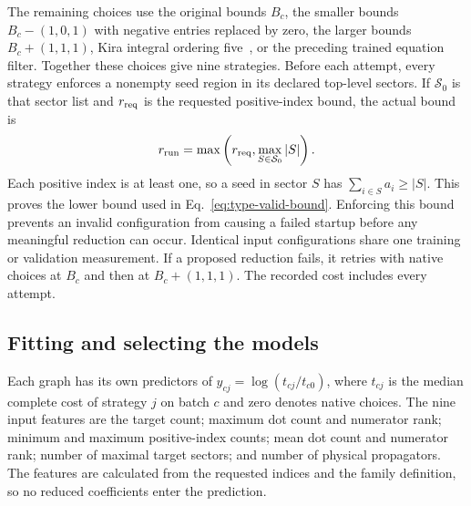 The remaining choices use the original bounds $B_c$, the smaller bounds
$B_c-(1,0,1)$ with negative entries replaced by zero, the larger bounds
$B_c+(1,1,1)$, Kira integral ordering five~\cite{Kira12}, or the preceding
trained equation filter. Together these choices give nine strategies.
Before each attempt, every strategy enforces a nonempty seed region in
its declared top-level sectors. If $\mathcal S_0$ is that sector list and
$r_{\rm req}$ is the requested positive-index bound, the actual bound is
\begin{equation}
 r_{\rm run}=\max\left(r_{\rm req},\max_{S\in\mathcal S_0}|S|\right).
 \label{eq:type-valid-bound}
\end{equation}
Each positive index is at least one, so a seed in sector $S$ has
$\sum_{i\in S}a_i\geq|S|$. This proves the lower bound used in
Eq.~\eqref{eq:type-valid-bound}. Enforcing this bound prevents an invalid configuration from causing a failed startup before any meaningful reduction can occur.
Identical input configurations share one training or validation measurement.
If a proposed reduction fails, it retries with native choices at $B_c$
and then at $B_c+(1,1,1)$. The recorded cost includes every attempt.

\subsection{Fitting and selecting the models}
Each graph has its own predictors of
$y_{cj}=\log(t_{cj}/t_{c0})$, where $t_{cj}$ is the median complete cost of
strategy $j$ on batch $c$ and zero denotes native choices. The nine input
features are the target count; maximum dot count and numerator rank;
minimum and maximum positive-index counts; mean dot count and numerator
rank; number of maximal target sectors; and number of physical
propagators. The features are calculated from the requested indices and the family definition, so no reduced coefficients enter the prediction.

